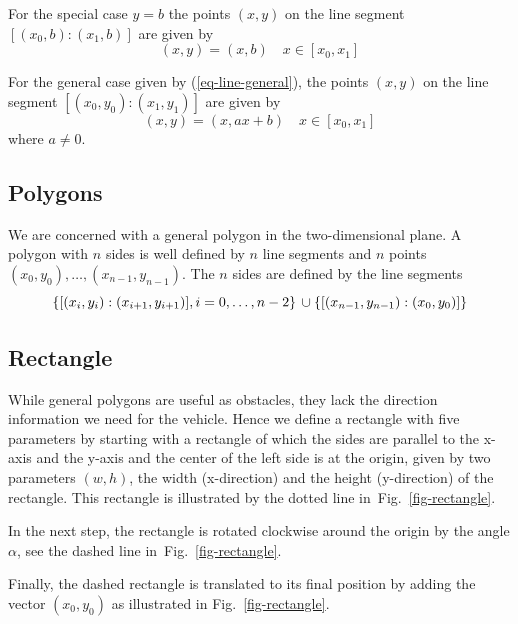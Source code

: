 \documentclass[11pt]{article}
\newcommand{\eqn}[1]{(\ref{#1})}
\newcommand{\figref}[1]{Fig.~\eqref{#1}}
\begin{document}
For the special case $y = b$ the points $(x, y)$ on the line segment
$[(x_0, b):(x_1, b)]$ are given by
\begin{equation}
    (x, y) = (x, b)\quad x\in [x_0, x_1]\label{eq-seg-yb}
\end{equation}

For the general case given by \eqn{eq-line-general}, the points $(x, y)$ on
the line segment $[(x_0, y_0):(x_1, y_1)]$ are given by
\begin{equation}
    (x, y) = (x, ax + b)\quad x\in [x_0, x_1]\label{eq-seg-general}
\end{equation}
where $a\neq 0$.

\subsection{Polygons}
\label{sec-polygons}

We are concerned with a general polygon in the two-dimensional plane. A polygon
with $n$ sides is well defined by $n$ line segments and $n$ points $(x_0,
y_0),\ldots,(x_{n-1}, y_{n-1})$. The $n$ sides are defined by the line segments
\begin{equation}
    \left\{[(x_i, y_i):(x_{i+1}, y_{i+1})], i=0,\ldots,n-2\right\}\\
\cup\left\{[(x_{n-1}, y_{n-1}):(x_{0}, y_{0})]\right\}
\end{equation}

\subsection{Rectangle}
\label{sec-rectangle}
While general polygons are useful as obstacles, they lack the direction
information we need for the vehicle.  Hence we define a rectangle with five
parameters by starting with a rectangle of which the sides are parallel to
the x-axis and the y-axis and the center of the left side is at the origin,
given by two parameters $(w, h)$, the width (x-direction) and the height 
(y-direction) of the rectangle. This rectangle is illustrated by the dotted 
line in~\figref{fig-rectangle}.

In the next step, the rectangle is rotated clockwise around the origin by the
angle $\alpha$, see the dashed line in~\figref{fig-rectangle}.

Finally, the dashed rectangle is translated to its final position by adding the
vector $(x_0, y_0)$ as illustrated in \figref{fig-rectangle}.
\end{document}
